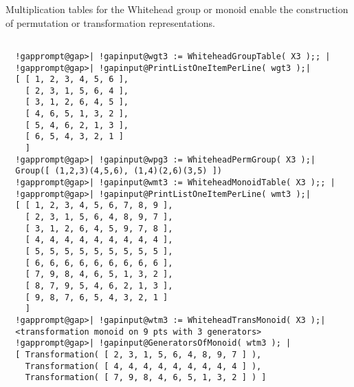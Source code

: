 \documentclass[a4paper,11pt]{report}
\begin{document}
{{{ Multiplication tables for the Whitehead group or monoid enable the
construction of permutation or transformation representations. }

 
\begin{Verbatim}[commandchars=!@|,fontsize=\small,frame=single,label=Example]
  
  !gapprompt@gap>| !gapinput@wgt3 := WhiteheadGroupTable( X3 );; |
  !gapprompt@gap>| !gapinput@PrintListOneItemPerLine( wgt3 );|
  [ [ 1, 2, 3, 4, 5, 6 ],
    [ 2, 3, 1, 5, 6, 4 ],
    [ 3, 1, 2, 6, 4, 5 ],
    [ 4, 6, 5, 1, 3, 2 ],
    [ 5, 4, 6, 2, 1, 3 ],
    [ 6, 5, 4, 3, 2, 1 ]
    ]
  !gapprompt@gap>| !gapinput@wpg3 := WhiteheadPermGroup( X3 );|
  Group([ (1,2,3)(4,5,6), (1,4)(2,6)(3,5) ])
  !gapprompt@gap>| !gapinput@wmt3 := WhiteheadMonoidTable( X3 );; |
  !gapprompt@gap>| !gapinput@PrintListOneItemPerLine( wmt3 );|
  [ [ 1, 2, 3, 4, 5, 6, 7, 8, 9 ],
    [ 2, 3, 1, 5, 6, 4, 8, 9, 7 ],
    [ 3, 1, 2, 6, 4, 5, 9, 7, 8 ],
    [ 4, 4, 4, 4, 4, 4, 4, 4, 4 ],
    [ 5, 5, 5, 5, 5, 5, 5, 5, 5 ],
    [ 6, 6, 6, 6, 6, 6, 6, 6, 6 ],
    [ 7, 9, 8, 4, 6, 5, 1, 3, 2 ],
    [ 8, 7, 9, 5, 4, 6, 2, 1, 3 ],
    [ 9, 8, 7, 6, 5, 4, 3, 2, 1 ]
    ]
  !gapprompt@gap>| !gapinput@wtm3 := WhiteheadTransMonoid( X3 );|
  <transformation monoid on 9 pts with 3 generators>
  !gapprompt@gap>| !gapinput@GeneratorsOfMonoid( wtm3 ); |
  [ Transformation( [ 2, 3, 1, 5, 6, 4, 8, 9, 7 ] ), 
    Transformation( [ 4, 4, 4, 4, 4, 4, 4, 4, 4 ] ), 
    Transformation( [ 7, 9, 8, 4, 6, 5, 1, 3, 2 ] ) ]
  
\end{Verbatim}
 }

 }

            
\end{document}
